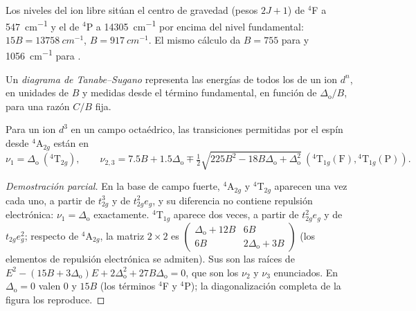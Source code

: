 \begin{example}\label{ex:b3:complex-spectra-magnetism:free-B}
Los niveles del ion  libre sitúan el centro de gravedad (pesos $2J + 1$) de $^4$F a
\qty{547}{cm^{-1}} y el de $^4$P a \qty{14305}{cm^{-1}} por encima del nivel fundamental: $15B = \qty{13758}{cm^{-1}}$,
$B = \qty{917}{cm^{-1}}$. El mismo cálculo da $B = 755$ para  y \qty{1056}{cm^{-1}} para
.
\end{example}

\begin{definition}\label{def:b3:complex-spectra-magnetism:tanabe-sugano}
Un \emph{diagrama de Tanabe--Sugano} representa las energías de
todos los  de un ion $d^n$, en unidades de $B$ y medidas desde el
término fundamental, en función de $\Delta_{\mathrm o}/B$, para una razón $C/B$ fija.
\end{definition}

\begin{proposition}\label{prop:b3:complex-spectra-magnetism:d3-bands}
Para un ion $d^3$ en un campo octaédrico, las transiciones permitidas por el espín desde $^4$A$_{2g}$ están en
\[
  \nu_1 = \Delta_{\mathrm o}\ (^4\mathrm T_{2g}), \qquad
  \nu_{2,3} = 7.5B + 1.5\Delta_{\mathrm o} \mp \tfrac12\sqrt{225B^2 - 18B\Delta_{\mathrm o} + \Delta_{\mathrm o}^2}\ (^4\mathrm T_{1g}(\mathrm F), {}^4\mathrm T_{1g}(\mathrm P)).
\]
\end{proposition}

\begin{proof}[Demostración parcial]
En la base de campo fuerte, $^4$A$_{2g}$ y $^4$T$_{2g}$ aparecen una vez cada uno, a partir de $t_{2g}^3$ y de $t_{2g}^2e_g$, y
su diferencia no contiene repulsión electrónica: $\nu_1 = \Delta_{\mathrm o}$ exactamente. $^4$T$_{1g}$ aparece
dos veces, a partir de $t_{2g}^2e_g$ y de $t_{2g}e_g^2$; respecto de $^4$A$_{2g}$, la matriz $2\times2$ es
$\begin{pmatrix}\Delta_{\mathrm o} + 12B & 6B\\ 6B & 2\Delta_{\mathrm o} + 3B\end{pmatrix}$ (los elementos de repulsión electrónica se admiten).
Sus  son las raíces de $E^2 - (15B + 3\Delta_{\mathrm o})E + 2\Delta_{\mathrm o}^2 + 27B\Delta_{\mathrm o} = 0$, que son los
$\nu_2$ y $\nu_3$ enunciados. En $\Delta_{\mathrm o} = 0$ valen 0 y $15B$ (los términos $^4$F y $^4$P); la
diagonalización completa de la figura los reproduce.
\end{proof}

